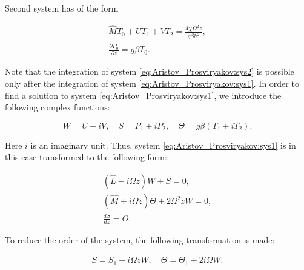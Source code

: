 Second system has of the form

\begin{gather}

\label{eq:Aristov_Prosviryakov:sys2}

\hat{M}T_0+UT_1+VT_2=\frac{4\chi\Omega^2 z}{g\beta h^2},

\\

\frac{\partial P_0}{\partial z}=g\beta T_0.

\end{gather}



Note that the integration of system \eqref{eq:Aristov_Prosviryakov:sys2} is possible only after the integration of system \eqref{eq:Aristov_Prosviryakov:sys1}. In order to find a solution to system \eqref{eq:Aristov_Prosviryakov:sys1}, we introduce the following complex functions:

$$

W=U+iV,\quad 

S=P_1+iP_2,\quad 

\Theta=g\beta\left(T_1+iT_2\right).$$

Here  $i$ is an imaginary unit. Thus, system \eqref{eq:Aristov_Prosviryakov:sys1} is in this case transformed to the following form:

 \begin{gather}

(\hat{L}-i\Omega z) W+S=0,

\\

       \label{eq:Aristov_Prosviryakov:sys1complex}

(\hat{M}+i\Omega z) \Theta+2\Omega^2 z W=0,       

\\

\frac{d S}{dz}=\Theta.      

 \end{gather}

 

To reduce the order of the system, the following transformation is made:

 \begin{gather}

       \label{eq:Aristov_Prosviryakov:trans}

S=S_1+i\Omega z W,

\quad 

\Theta=\Theta_1+2i\Omega W.    

\end{gather}

